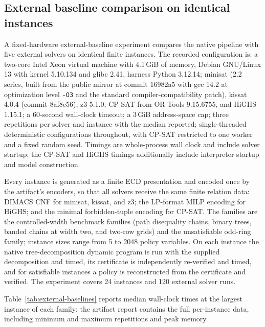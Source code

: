 \documentclass[11pt]{article}
\theoremstyle{plain}
\theoremstyle{definition}
\theoremstyle{remark}
\begin{document}
\subsection{External baseline comparison on identical instances}
\label{subsec:external-baselines}

A fixed-hardware external-baseline experiment compares the native pipeline with
five external solvers on identical finite instances.  The recorded
configuration is: a two-core Intel Xeon virtual machine with 4.1\,GiB of
memory, Debian GNU/Linux 13 with kernel 5.10.134 and glibc 2.41, harness
Python 3.12.14; minisat (2.2 series, built from the public mirror at commit
16982a5 with gcc 14.2 at optimization level \texttt{-O3} and the standard
compiler-compatibility patch), kissat 4.0.4 (commit 8af8e56), z3 5.1.0, CP-SAT
from OR-Tools 9.15.6755, and HiGHS 1.15.1; a 60-second wall-clock timeout; a
3\,GiB address-space cap; three repetitions per solver and instance with the
median reported; single-threaded deterministic configurations throughout, with
CP-SAT restricted to one worker and a fixed random seed.  Timings are
whole-process wall clock and include solver startup; the CP-SAT and HiGHS
timings additionally include interpreter startup and model construction.

Every instance is generated as a finite ECD presentation and encoded once by
the artifact's encoders, so that all solvers receive the same finite relation
data: DIMACS CNF for minisat, kissat, and z3; the LP-format MILP encoding for
HiGHS; and the minimal forbidden-tuple encoding for CP-SAT.  The families are
the controlled-width benchmark families (path disequality chains, binary
trees, banded chains at width two, and two-row grids) and the unsatisfiable
odd-ring family; instance sizes range from 5 to 2048 policy variables.  On each
instance the native tree-decomposition dynamic program is run with the supplied
decomposition and timed, its certificate is independently re-verified and
timed, and for satisfiable instances a policy is reconstructed from the
certificate and verified.  The experiment covers 24 instances and 120 external
solver runs.

Table~\ref{tab:external-baselines} reports median wall-clock times at the
largest instance of each family; the artifact report contains the full
per-instance data, including minimum and maximum repetitions and peak memory.
\end{document}
